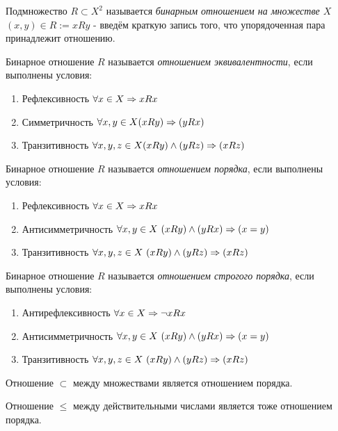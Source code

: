 \begin{definition}
    Подмножество $R \subset X^2$ называется \textit{бинарным отношением на множестве $X$} \\
    $(x, y) \in R := xRy$ - введём краткую запись того, что упорядоченная пара принадлежит отношению.
\end{definition}

\begin{definition}
    Бинарное отношение $R$ называется \textit{отношением эквивалентности}, если выполнены условия:
    \begin{enumerate}
        \item Рефлексивность $\forall x \in X \Rightarrow xRx$
        \item Симметричность $\forall x, y \in X (xRy) \Rightarrow (yRx)$
        \item Транзитивность $\forall x, y, z \in X (xRy) \wedge (yRz) \Rightarrow (xRz)$
    \end{enumerate}
\end{definition}

\begin{definition}
    Бинарное отношение $R$ называется \textit{отношением порядка}, если выполнены условия:
    \begin{enumerate}
        \item Рефлексивность $\forall x \in X \Rightarrow xRx$
        \item Антисимметричность $\forall x, y \in X\ (xRy) \wedge (yRx) \Ra (x = y)$
        \item Транзитивность
        $\forall x, y, z \in X\ (xRy) \wedge (yRz) \Ra (xRz)$
    \end{enumerate}
\end{definition}

\begin{adefinition}
    Бинарное отношение $R$ называется \textit{отношением строгого порядка}, если выполнены условия:
    \begin{enumerate}
        \item Антирефлексивность $\forall x \in X \Rightarrow \neg xRx$
        \item Антисимметричность $\forall x, y \in X\ (xRy) \wedge (yRx) \Ra (x = y)$
        \item Транзитивность
        $\forall x, y, z \in X\ (xRy) \wedge (yRz) \Ra (xRz)$
    \end{enumerate}
\end{adefinition}

\begin{example}
    Отношение $\subset$ между множествами является отношением порядка.
\end{example}
\begin{example}
    Отношение $\le$ между действительными числами является тоже отношением порядка.
\end{example}

